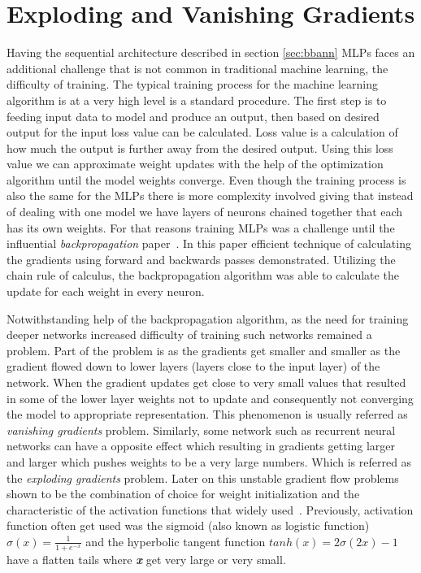 \section{Exploding and Vanishing Gradients} \label{sec:gradients}
Having the sequential architecture described in section \ref{sec:bbann} MLPs faces an additional challenge that is not common in traditional machine learning, the difficulty of training. 
The typical training process for the machine learning algorithm is at a very high level is a standard procedure.  
The first step is to feeding input data to model and produce an output, then based on desired output for the input loss value can be calculated.
Loss value is a calculation of how much the output is further away from the desired output. 
Using this loss value we can approximate weight updates with the help of the optimization algorithm until the model weights converge.
Even though the training process is also the same for the MLPs there is more complexity involved giving that instead of dealing with one model we have layers of neurons chained together that each has its own weights. 
For that reasons training MLPs was a challenge until the influential \emph{backpropagation} paper~\cite{backprop}. In this paper efficient technique of calculating the gradients using forward and backwards passes demonstrated.
Utilizing the chain rule of calculus, the backpropagation algorithm was able to calculate the update for each weight in every neuron.

Notwithstanding help of the backpropagation algorithm, as the need for training deeper networks increased difficulty of training such networks remained a problem.
Part of the problem is as the gradients get smaller and smaller as the gradient flowed down to lower layers (layers close to the input layer) of the network. 
When the gradient updates get close to very small values that resulted in some of the lower layer weights not to update and consequently not converging the model to appropriate representation.
This phenomenon is usually referred as \emph{vanishing gradients} problem.
Similarly, some network such as recurrent neural networks can have a opposite effect which resulting in gradients getting larger and larger which pushes weights to be a very large numbers. 
Which is referred as the \emph{exploding gradients} problem.
Later on this unstable gradient flow problems shown to be the combination of choice for weight initialization and the characteristic of the activation functions that widely used~\cite{vanishgrads}.
Previously, activation function often get used was the sigmoid (also known as logistic function) \(\sigma(x) = \frac{1}{1 + e^{-x}}\) and the hyperbolic tangent function \(tanh(x) = 2\sigma(2x) -1\) have a flatten tails where \textbf{\textit{x}} get very large or very small.



